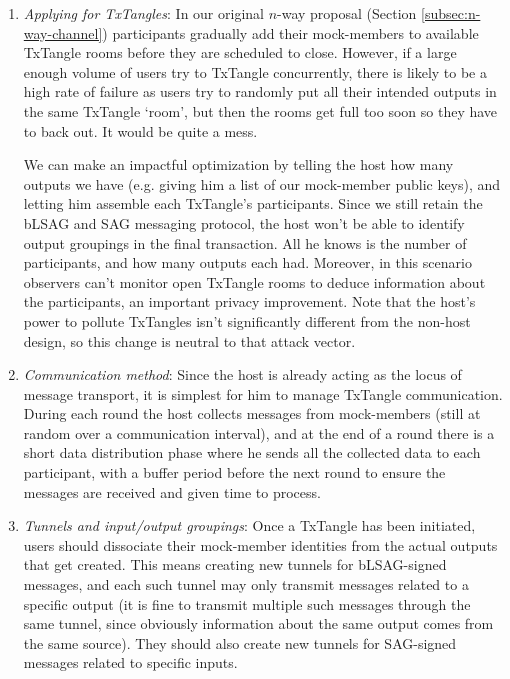 \begin{enumerate}
    \item {\em Applying for TxTangles}: In our original $n$-way proposal (Section \ref{subsec:n-way-channel}) participants gradually add their mock-members to available TxTangle rooms before they are scheduled to close. However, if a large enough volume of users try to TxTangle concurrently, there is likely to be a high rate of failure as users try to randomly put all their intended outputs in the same TxTangle `room', but then the rooms get full too soon so they have to back out. It would be quite a mess.

    We can make an impactful optimization by telling the host how many outputs we have (e.g. giving him a list of our mock-member public keys), and letting him assemble each TxTangle's participants. Since we still retain the bLSAG and SAG messaging protocol, the host won't be able to identify output groupings in the final transaction. All he knows is the number of participants, and how many outputs each had. Moreover, in this scenario observers can't monitor open TxTangle rooms to deduce information about the participants, an important privacy improvement. Note that the host's power to pollute TxTangles isn't significantly different from the non-host design, so this change is neutral to that attack vector.
    \item {\em Communication method}: Since the host is already acting as the locus of message transport, it is simplest for him to manage TxTangle communication. During each round the host collects messages from mock-members (still at random over a communication interval), and at the end of a round there is a short data distribution phase where he sends all the collected data to each participant, with a buffer period before the next round to ensure the messages are received and given time to process.%
    \item {\em Tunnels and input/output groupings}: Once a TxTangle has been initiated, users should dissociate their mock-member identities from the actual outputs that get created. This means creating new tunnels for bLSAG-signed messages, and each such tunnel may only transmit messages related to a specific output (it is fine to transmit multiple such messages through the same tunnel, since obviously information about the same output comes from the same source). They should also create new tunnels for SAG-signed messages related to specific inputs.

\end{enumerate}
